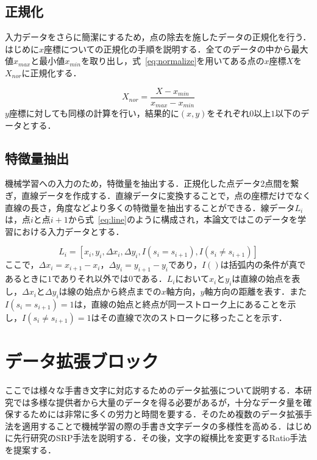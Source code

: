 \subsection{正規化}
\label{normal}
入力データをさらに簡潔にするため，点の除去を施したデータの正規化を行う．はじめに$x$座標についての正規化の手順を説明する．全てのデータの中から最大値$x_{max}$と最小値$x_{min}$を取り出し，式~\ref{eq:normalize}を用いてある点の$x$座標$X$を$X_{nor}$に正規化する．

\begin{equation}
  X_{nor} = \frac{X - x_{min}}{x_{max}-x_{min}}
  \label{eq:normalize}
\end{equation}
$y$座標に対しても同様の計算を行い，結果的に$(x, y)$をそれぞれ$0$以上$1$以下のデータとする．

\subsection{特徴量抽出}
\label{extract}
機械学習への入力のため，特徴量を抽出する．正規化した点データ2点間を繋ぎ，直線データを作成する．直線データに変換することで，点の座標だけでなく直線の長さ，角度などより多くの特徴量を抽出することができる．線データ$L_i$は，点$i$と点$i+1$から式~\ref{eq:line}のように構成され，本論文ではこのデータを学習における入力データとする．

\begin{equation}
  L_i = [x_i, y_i, \Delta{x_i}, \Delta{y_i}, I(s_i=s_{i+1}), I(s_i \neq s_{i+1})]
  \label{eq:line}
\end{equation}
ここで，$\Delta{x_i}=x_{i+1}-x_i$，$\Delta{y_i}=y_{i+1}-y_i$であり，$I()$は括弧内の条件が真であるときに$1$でありそれ以外では$0$である．$L_i$において$x_i$と$y_i$は直線の始点を表し，$\Delta{x_i}$と$\Delta{y_i}$は線の始点から終点までの$x$軸方向，$y$軸方向の距離を表す．また$I(s_i=s_{i+1})=1$は，直線の始点と終点が同一ストローク上にあることを示し，$I(s_i \neq s_{i+1})=1$はその直線で次のストロークに移ったことを示す．

\section{データ拡張ブロック}
\label{augment}
ここでは様々な手書き文字に対応するためのデータ拡張について説明する．本研究では多様な提供者から大量のデータを得る必要があるが，十分なデータ量を確保するためには非常に多くの労力と時間を要する．そのため複数のデータ拡張手法を適用することで機械学習の際の手書き文字データの多様性を高める．はじめに先行研究のSRP手法を説明する．その後，文字の縦横比を変更するRatio手法を提案する．


